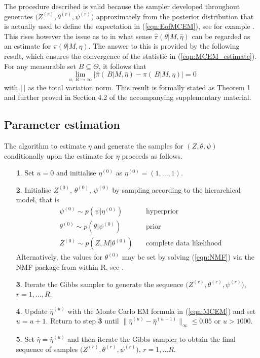 \documentclass{bioinfo}
\begin{document}
The procedure described is valid because the sampler developed
throughout generates $\big(Z^{(r)}, \theta^{(r)}, \psi^{(r)}\big)$
approximately from the posterior distribution that is actually used to
define the expectation in (\ref{eqn:EofMCEM}), see for example
\cite{FM}. This rises however the issue as to in what sense
$\widehat\pi(\theta|M, \hat\eta)$ can be regarded as an estimate for
$\pi(\theta|M, \eta)$. The answer to this is provided by the following
result, which ensures the convergence of the statistic in
(\ref{eqn:MCEM_estimate}). For any measurable set $B\subseteq
\Theta$, it follows that 
\[
    \lim_{u,\ R\to\infty}
    \Big|
       \widehat\pi(\, B|M, \hat\eta) - \pi(\, B|M,\eta)
    \Big|
   =
    0
\]
with $|\, |$ as the total variation norm. This result is
formally stated as Theorem 1 and further proved in Section 4.2 of the 
accompanying supplementary material.





\subsection{Parameter estimation}
The algorithm to estimate $\eta$ and generate the samples for $(Z,
\theta, \psi)$ conditionally upon the estimate for $\eta$ proceeds as 
follows. 
\begin{enumerate}
\item[\textbf{1}.] Set $u = 0$ and initialise $\eta^{(0)}$ as
  $\eta^{(0)} = (1, \ldots, 1)$.
\item[\textbf{2}.] Initialise $Z^{(0)}$, $\theta^{(0)}$, $\psi^{(0)}$
  by sampling according to the hierarchical model, that is
  \begin{align*}
     &\psi^{(0)} \sim p(\psi | \eta^{(0)}) &\ 
        &\text{hyperprior}\\ 
     &\theta^{(0)} \sim p(\theta | \psi^{(0)}) &\ 
        &\text{prior}\\
     &Z^{(0)} \sim p(Z, M|\theta^{(0)}) &\ 
        &\text{complete data likelihood}
  \end{align*}
  Alternatively, the values for $\theta^{(0)}$ may be set by solving 
  (\ref{eqn:NMF}) via the NMF package from within R, see
  \citealp{GS}.
\item[\textbf{3}.] Iterate the Gibbs sampler to generate the sequence
 $\big(Z^{(r)}, \theta^{(r)}, \psi^{(r)}\big)$, $r = 1, \ldots, R$.
\item[\textbf{4}.] Update $\hat\eta^{(u)}$ with the Monte Carlo EM
formula in (\ref{eqn:MCEM}) and set $u = u+1$. Return to step
\textbf{3} until $\big\|\hat\eta^{(u)} - \hat\eta^{(u-1)}\big\|_\infty  
\leqslant 0.05$ or $u > 1000$. 
\item[\textbf{5}.] Set $\hat\eta = \hat\eta^{(u)}$ and then iterate
  the Gibbs sampler to obtain the final sequence of samples
  $\big(Z^{(r)}, \theta^{(r)}, \psi^{(r)}\big)$, $r=1, \ldots
  R$. 
\end{enumerate}
\end{document}
